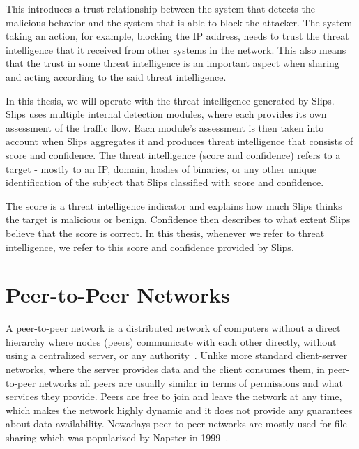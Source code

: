 This introduces a trust relationship between the system that detects the malicious behavior and the system that is able to block the attacker.
The system taking an action, for example, blocking the IP address, needs to trust the threat intelligence that it received from other systems in the network.
This also means that the trust in some threat intelligence is an important aspect when sharing and acting according to the said threat intelligence.

In this thesis, we will operate with the threat intelligence generated by Slips.
Slips uses multiple internal detection modules, where each provides its own assessment of the traffic flow. 
Each module's assessment is then taken into account when Slips aggregates it and produces threat intelligence that consists of score and confidence.
The threat intelligence (score and confidence) refers to a target - mostly to an IP, domain, hashes of binaries, or any other unique identification of the subject that Slips classified with score and confidence.

The score is a threat intelligence indicator and explains how much Slips thinks the target is malicious or benign.
Confidence then describes to what extent Slips believe that the score is correct.
In this thesis, whenever we refer to threat intelligence, we refer to this score and confidence provided by Slips.

\section{Peer-to-Peer Networks}
\label{sec:peer-to-peer-networks}
A peer-to-peer network is a distributed network of computers without a direct hierarchy where nodes (peers) communicate with each other directly, without using a centralized server, or any authority~\cite{schollmeier}.
Unlike more standard client-server networks, where the server provides data and the client consumes them, in peer-to-peer networks all peers are usually similar in terms of permissions and what services they provide.
Peers are free to join and leave the network at any time, which makes the network highly dynamic and it does not provide any guarantees about data availability.
Nowadays peer-to-peer networks are mostly used for file sharing which was popularized by Napster in 1999~\cite{saroiu}.